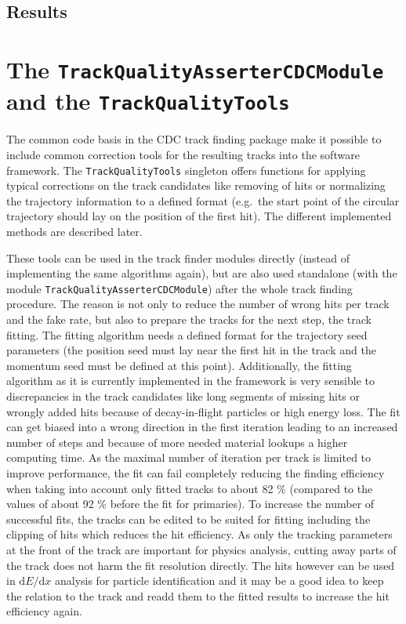 \subsection{Results}


\section{The \texttt{Track\-Quality\-Asserter\-CDC\-Module} and the \texttt{Track\-Quality\-Tools}}  \label{section-quality}

The common code basis in the CDC track finding package make it possible to include common correction tools for the resulting tracks into the software framework. The \texttt{Track\-Quality\-Tools} singleton offers functions for applying typical corrections on the track candidates like removing of hits or normalizing the trajectory information to a defined format (e.g.\ the start point of the circular trajectory should lay on the position of the first hit). The different implemented methods are described later.

These tools can be used in the track finder modules directly (instead of implementing the same algorithms again), but are also used standalone (with the module \texttt{Track\-Quality\-Asserter\-CDC\-Module}) after the whole track finding procedure. The reason is not only to reduce the number of wrong hits per track and the fake rate, but also to prepare the tracks for the next step, the track fitting. The fitting algorithm needs a defined format for the trajectory seed parameters (the position seed must lay near the first hit in the track and the momentum seed must be defined at this point). Additionally, the fitting algorithm as it is currently implemented in the framework is very sensible to discrepancies in the track candidates like long segments of missing hits or wrongly added hits because of decay-in-flight particles or high energy loss. The fit can get biased into a wrong direction in the first iteration leading to an increased number of steps and because of more needed material lookups a higher computing time. As the maximal number of iteration per track is limited to improve performance, the fit can fail completely reducing the finding efficiency when taking into account only fitted tracks to about 82 \% (compared to the values of about 92 \% before the fit for primaries). To increase the number of successful fits, the tracks can be edited to be suited for fitting including the clipping of hits which reduces the hit efficiency. As only the tracking parameters at the front of the track are important for physics analysis, cutting away parts of the track does not harm the fit resolution directly. The hits however can be used in $\mathrm d E/\mathrm d x$ analysis for particle identification and it may be a good idea to keep the relation to the track and readd them to the fitted results to increase the hit efficiency again. 

